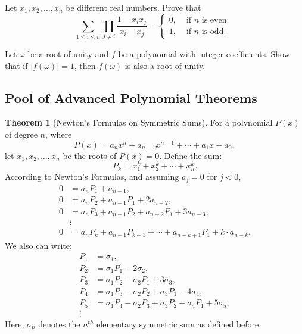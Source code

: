 \documentclass[12pt,a4paper]{memoir}
\theoremstyle{definition}
\newtheorem{theorem}{Theorem}
\begin{document}
\begin{question}[name={2019 IMO Shortlist}]
	Let $x_1, x_2, \dots, x_n$ be different real numbers. Prove that
	\[\sum_{1 \leqslant i \leqslant n} \prod_{j \neq i} \frac{1-x_{i} x_{j}}{x_{i}-x_{j}}=\left\{\begin{array}{ll}
		0, & \text { if } n \text { is even; } \\
		1, & \text { if } n \text { is odd. }
	\end{array}\right.\]
\end{question}


\begin{question}[name={2014 HMIC}]
	Let $\omega$ be a root of unity and $f$ be a polynomial with integer coefficients. Show that if $|f(\omega)|=1$, then $f(\omega)$ is also a root of unity.
\end{question}



\newpage
\subsection{Pool of Advanced Polynomial Theorems}

\begin{tcolorbox}[title={Newton's Sums}]
	\begin{theorem}[Newton's Formulas on Symmetric Sums]
		For a polynomial $P(x)$ of degree $n$, where
		\[P(x) = a_nx^n + a_{n-1}x^{n-1} + \cdots + a_1x + a_0,\]
		let $x_1,x_2,\ldots,x_n$ be the roots of $P(x)=0$. Define the sum:
		\[P_k = x_1^k + x_2^k + \cdots + x_n^k.\]
		According to Newton's Formulas, and assuming $a_j = 0$ for $j<0$,
		\begin{align*}
			0 &= a_nP_1 + a_{n-1},\\
			0 &= a_nP_2 + a_{n-1}P_1 + 2a_{n-2},\\
			0 &= a_nP_3 + a_{n-1}P_2 + a_{n-2}P_1 + 3a_{n-3},\\
			&\vdots\\
			0 &= a_nP_k+a_{n-1}P_{k-1}+\cdots+a_{n-k+1}P_1+k\cdot a_{n-k}.
		\end{align*}
		We also can write:
		\begin{align*}
			P_1 &= \sigma_1,\\
			P_2 &= \sigma_1P_1 - 2\sigma_2,\\
			P_3 &= \sigma_1P_2 - \sigma_2P_1 + 3\sigma_3,\\
			P_4 &= \sigma_1P_3 - \sigma_2P_2 + \sigma_3P_1 - 4\sigma_4,\\
			P_5 &= \sigma_1P_4 - \sigma_2P_3 + \sigma_3P_2 - \sigma_4P_1 + 5\sigma_5,\\
			\vdots
		\end{align*}
		Here, $\sigma_n$ denotes the $n^{th}$ elementary symmetric sum as defined before.
	\end{theorem}
\end{tcolorbox}
\end{document}
